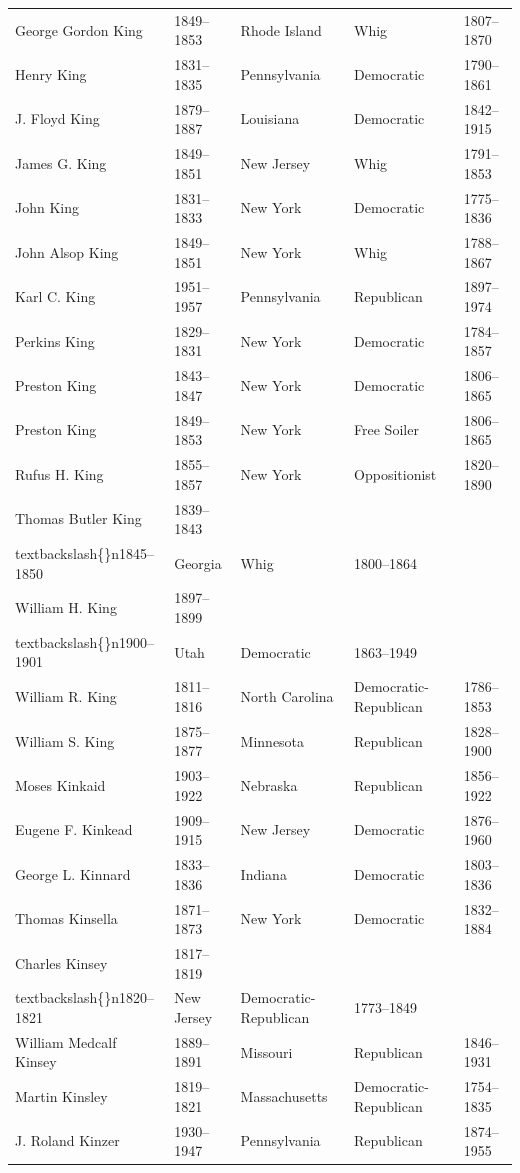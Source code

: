 \documentclass{article}
\begin{document}
\begin{tabular}{lllll}
George Gordon King & 1849–1853 & Rhode Island & Whig & 1807–1870 \\
Henry King & 1831–1835 & Pennsylvania & Democratic & 1790–1861 \\
J. Floyd King & 1879–1887 & Louisiana & Democratic & 1842–1915 \\
James G. King & 1849–1851 & New Jersey & Whig & 1791–1853 \\
John King & 1831–1833 & New York & Democratic & 1775–1836 \\
John Alsop King & 1849–1851 & New York & Whig & 1788–1867 \\
Karl C. King & 1951–1957 & Pennsylvania & Republican & 1897–1974 \\
Perkins King & 1829–1831 & New York & Democratic & 1784–1857 \\
Preston King & 1843–1847 & New York & Democratic & 1806–1865 \\
Preston King & 1849–1853 & New York & Free Soiler & 1806–1865 \\
Rufus H. King & 1855–1857 & New York & Oppositionist & 1820–1890 \\
Thomas Butler King & 1839–1843\\textbackslash\{\}n1845–1850 & Georgia & Whig & 1800–1864 \\
William H. King & 1897–1899\\textbackslash\{\}n1900–1901 & Utah & Democratic & 1863–1949 \\
William R. King & 1811–1816 & North Carolina & Democratic-Republican & 1786–1853 \\
William S. King & 1875–1877 & Minnesota & Republican & 1828–1900 \\
Moses Kinkaid & 1903–1922 & Nebraska & Republican & 1856–1922 \\
Eugene F. Kinkead & 1909–1915 & New Jersey & Democratic & 1876–1960 \\
George L. Kinnard & 1833–1836 & Indiana & Democratic & 1803–1836 \\
Thomas Kinsella & 1871–1873 & New York & Democratic & 1832–1884 \\
Charles Kinsey & 1817–1819\\textbackslash\{\}n1820–1821 & New Jersey & Democratic-Republican & 1773–1849 \\
William Medcalf Kinsey & 1889–1891 & Missouri & Republican & 1846–1931 \\
Martin Kinsley & 1819–1821 & Massachusetts & Democratic-Republican & 1754–1835 \\
J. Roland Kinzer & 1930–1947 & Pennsylvania & Republican & 1874–1955 \\

\end{tabular}
\end{document}
